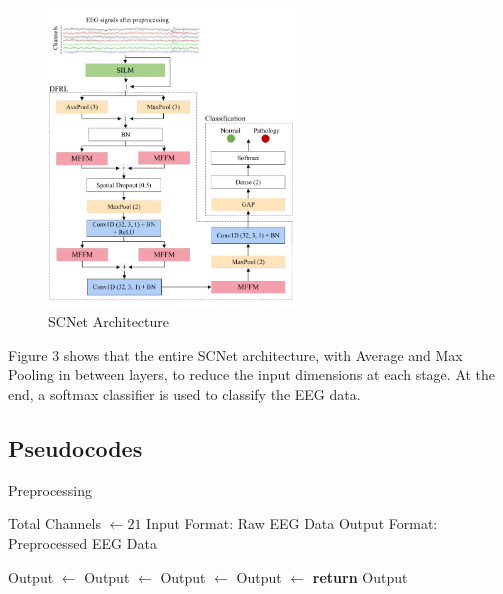 \documentclass[10pt]{article}
\begin{document}
\begin{figure}[H]
    \centering
    \includegraphics[width=0.59\textwidth]{model.png}
    \caption{SCNet Architecture}
\end{figure}
Figure 3 shows that the entire SCNet architecture, with Average and Max Pooling in between layers, to reduce the input dimensions at each stage. At the end, a softmax classifier is used to classify the EEG data.

\subsection{Pseudocodes}

\begin{algorithm}[H]
  \caption{Preprocessing}
      \begin{algorithmic}[1]
       
          \State Total Channels $\gets 21$
          \State Input Format: Raw EEG Data
          \State 
          \State Output Format: Preprocessed EEG Data
          \State
  
          \State Output $\gets$  
          \State Output $\gets$  
          \State Output $\gets$  
          \State Output $\gets$  
          \State \textbf{return} Output  
      \EndProcedure
      \end{algorithmic}
  \end{algorithm}
\end{document}
